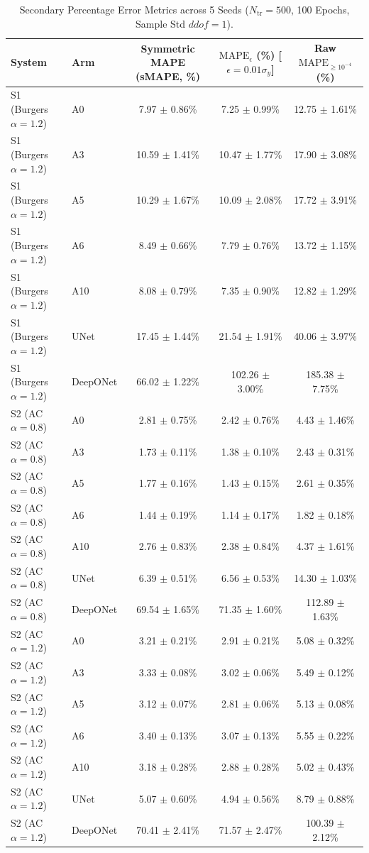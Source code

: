 \begin{table}[t]
\centering
\scriptsize
\caption{Secondary Percentage Error Metrics across 5 Seeds ($N_{\text{tr}}=500$, 100 Epochs, Sample Std $ddof=1$).}
\label{tab:secondary}
\begin{tabular}{llccc}
\toprule
System & Arm & Symmetric MAPE (sMAPE, \%) & $\text{MAPE}_\epsilon$ (\%) [$\epsilon=0.01\sigma_y$] & Raw $\text{MAPE}_{\ge 10^{-4}}$ (\%) \\
\midrule
S1 (Burgers $\alpha=1.2$) & A0 & 7.97 $\pm$ 0.86\% & 7.25 $\pm$ 0.99\% & 12.75 $\pm$ 1.61\% \\
S1 (Burgers $\alpha=1.2$) & A3 & 10.59 $\pm$ 1.41\% & 10.47 $\pm$ 1.77\% & 17.90 $\pm$ 3.08\% \\
S1 (Burgers $\alpha=1.2$) & A5 & 10.29 $\pm$ 1.67\% & 10.09 $\pm$ 2.08\% & 17.72 $\pm$ 3.91\% \\
S1 (Burgers $\alpha=1.2$) & A6 & 8.49 $\pm$ 0.66\% & 7.79 $\pm$ 0.76\% & 13.72 $\pm$ 1.15\% \\
S1 (Burgers $\alpha=1.2$) & A10 & 8.08 $\pm$ 0.79\% & 7.35 $\pm$ 0.90\% & 12.82 $\pm$ 1.29\% \\
S1 (Burgers $\alpha=1.2$) & UNet & 17.45 $\pm$ 1.44\% & 21.54 $\pm$ 1.91\% & 40.06 $\pm$ 3.97\% \\
S1 (Burgers $\alpha=1.2$) & DeepONet & 66.02 $\pm$ 1.22\% & 102.26 $\pm$ 3.00\% & 185.38 $\pm$ 7.75\% \\
S2 (AC $\alpha=0.8$) & A0 & 2.81 $\pm$ 0.75\% & 2.42 $\pm$ 0.76\% & 4.43 $\pm$ 1.46\% \\
S2 (AC $\alpha=0.8$) & A3 & 1.73 $\pm$ 0.11\% & 1.38 $\pm$ 0.10\% & 2.43 $\pm$ 0.31\% \\
S2 (AC $\alpha=0.8$) & A5 & 1.77 $\pm$ 0.16\% & 1.43 $\pm$ 0.15\% & 2.61 $\pm$ 0.35\% \\
S2 (AC $\alpha=0.8$) & A6 & 1.44 $\pm$ 0.19\% & 1.14 $\pm$ 0.17\% & 1.82 $\pm$ 0.18\% \\
S2 (AC $\alpha=0.8$) & A10 & 2.76 $\pm$ 0.83\% & 2.38 $\pm$ 0.84\% & 4.37 $\pm$ 1.61\% \\
S2 (AC $\alpha=0.8$) & UNet & 6.39 $\pm$ 0.51\% & 6.56 $\pm$ 0.53\% & 14.30 $\pm$ 1.03\% \\
S2 (AC $\alpha=0.8$) & DeepONet & 69.54 $\pm$ 1.65\% & 71.35 $\pm$ 1.60\% & 112.89 $\pm$ 1.63\% \\
S2 (AC $\alpha=1.2$) & A0 & 3.21 $\pm$ 0.21\% & 2.91 $\pm$ 0.21\% & 5.08 $\pm$ 0.32\% \\
S2 (AC $\alpha=1.2$) & A3 & 3.33 $\pm$ 0.08\% & 3.02 $\pm$ 0.06\% & 5.49 $\pm$ 0.12\% \\
S2 (AC $\alpha=1.2$) & A5 & 3.12 $\pm$ 0.07\% & 2.81 $\pm$ 0.06\% & 5.13 $\pm$ 0.08\% \\
S2 (AC $\alpha=1.2$) & A6 & 3.40 $\pm$ 0.13\% & 3.07 $\pm$ 0.13\% & 5.55 $\pm$ 0.22\% \\
S2 (AC $\alpha=1.2$) & A10 & 3.18 $\pm$ 0.28\% & 2.88 $\pm$ 0.28\% & 5.02 $\pm$ 0.43\% \\
S2 (AC $\alpha=1.2$) & UNet & 5.07 $\pm$ 0.60\% & 4.94 $\pm$ 0.56\% & 8.79 $\pm$ 0.88\% \\
S2 (AC $\alpha=1.2$) & DeepONet & 70.41 $\pm$ 2.41\% & 71.57 $\pm$ 2.47\% & 100.39 $\pm$ 2.12\% \\
\bottomrule
\end{tabular}
\end{table}
